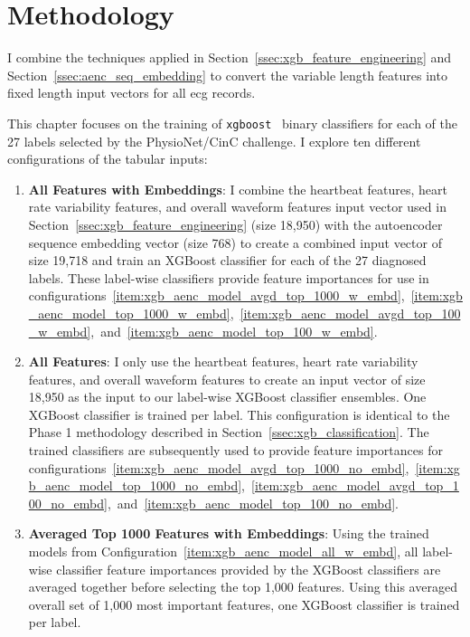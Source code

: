 \documentclass[\main/thesis.tex]{subfiles}
\begin{document}
\section{Methodology}

I combine the techniques applied in Section~\ref{ssec:xgb_feature_engineering} and Section~\ref{ssec:aenc_seq_embedding} to convert the variable length features into fixed length input vectors for all \gls{ecg} records.

This chapter focuses on the training of \texttt{xgboost}~\cite{chen_xgboost_2016} binary classifiers for each of the 27 labels selected by the PhysioNet/CinC challenge.
I explore ten different configurations of the tabular inputs:
\begin{enumerate}
    \item \label{item:xgb_aenc_model_all_w_embd} \textbf{All Features with Embeddings}: I combine the heartbeat features, heart rate variability features, and overall waveform features input vector used in Section~\ref{ssec:xgb_feature_engineering} (size 18,950) with the autoencoder sequence embedding vector (size 768) to create a combined input vector of size 19,718 and train an XGBoost classifier for each of the 27 diagnosed labels.
    These label-wise classifiers provide feature importances for use in configurations~\ref{item:xgb_aenc_model_avgd_top_1000_w_embd},~\ref{item:xgb_aenc_model_top_1000_w_embd},~\ref{item:xgb_aenc_model_avgd_top_100_w_embd},~and~\ref{item:xgb_aenc_model_top_100_w_embd}.
    \item \label{item:xgb_aenc_model_all_no_embd} \textbf{All Features}: I only use the heartbeat features, heart rate variability features, and overall waveform features to create an input vector of size 18,950 as the input to our label-wise XGBoost classifier ensembles. One XGBoost classifier is trained per label. This configuration is identical to the Phase 1 methodology described in Section~\ref{ssec:xgb_classification}.
    The trained classifiers are subsequently used to provide feature importances for configurations~\ref{item:xgb_aenc_model_avgd_top_1000_no_embd},~\ref{item:xgb_aenc_model_top_1000_no_embd},~\ref{item:xgb_aenc_model_avgd_top_100_no_embd},~and~\ref{item:xgb_aenc_model_top_100_no_embd}.
    \item \label{item:xgb_aenc_model_avgd_top_1000_w_embd} \textbf{Averaged Top 1000 Features with Embeddings}: Using the trained models from Configuration~\ref{item:xgb_aenc_model_all_w_embd}, all label-wise classifier feature importances provided by the XGBoost classifiers are averaged together before selecting the top 1,000 features. Using this averaged overall set of 1,000 most important features, one XGBoost classifier is trained per label.

\end{enumerate}
\end{document}
